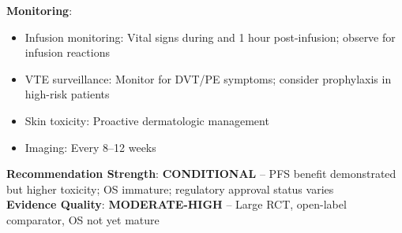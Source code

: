 \documentclass[10pt,letterpaper]{article}
\begin{document}
\begin{tcolorbox}
{\textbf{Monitoring}:
\begin{itemize}
\item Infusion monitoring: Vital signs during and 1 hour post-infusion; observe for infusion reactions
\item VTE surveillance: Monitor for DVT/PE symptoms; consider prophylaxis in high-risk patients
\item Skin toxicity: Proactive dermatologic management
\item Imaging: Every 8--12 weeks
\end{itemize}

\textbf{Recommendation Strength}: \textbf{CONDITIONAL} -- PFS benefit demonstrated but higher toxicity; OS immature; regulatory approval status varies\\
\textbf{Evidence Quality}: \textbf{MODERATE-HIGH} -- Large RCT, open-label comparator, OS not yet mature
}
\end{tcolorbox}

\vspace{3pt}
\end{document}
